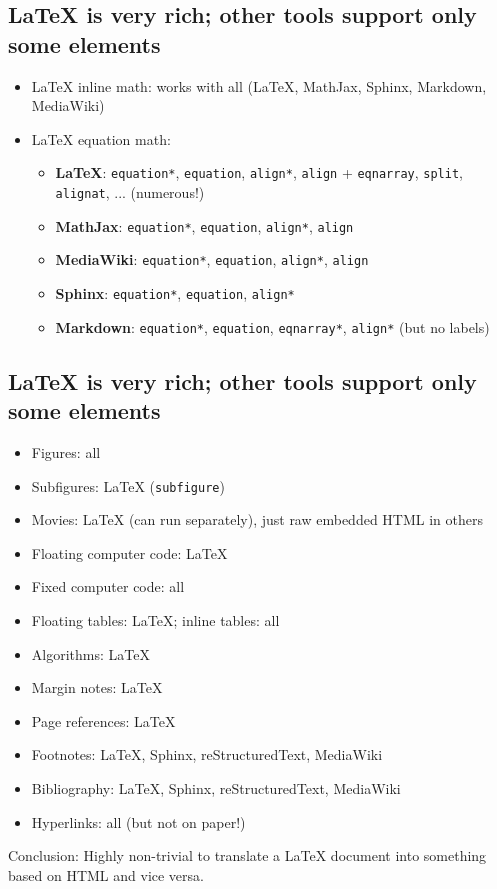 \documentclass[%
oneside,                 %
final,                   %
10pt]{article}
\begin{document}
\subsection{{\LaTeX} is very rich; other tools support only some elements}
\begin{itemize}
 \item {\LaTeX} inline math: works with all ({\LaTeX}, MathJax, Sphinx, Markdown, MediaWiki)
 \item {\LaTeX} equation math:
\begin{itemize}
    \item \textbf{LaTeX}: \texttt{equation*}, \texttt{equation}, \texttt{align*}, \texttt{align} + \texttt{eqnarray}, \texttt{split}, \texttt{alignat}, ... (numerous!)
    \item \textbf{MathJax}: \texttt{equation*}, \texttt{equation}, \texttt{align*}, \texttt{align}
    \item \textbf{MediaWiki}: \texttt{equation*}, \texttt{equation}, \texttt{align*}, \texttt{align}
    \item \textbf{Sphinx}: \texttt{equation*}, \texttt{equation}, \texttt{align*}
    \item \textbf{Markdown}: \texttt{equation*}, \texttt{equation}, \texttt{eqnarray*}, \texttt{align*} (but no labels)
\end{itemize}
\noindent
\end{itemize}
\noindent
\subsection{{\LaTeX} is very rich; other tools support only some elements}
\begin{itemize}
 \item Figures: all
 \item Subfigures: {\LaTeX} (\texttt{subfigure})
 \item Movies: {\LaTeX} (can run separately), just raw embedded HTML in others
 \item Floating computer code: {\LaTeX}
 \item Fixed computer code: all
 \item Floating tables: {\LaTeX}; inline tables: all
 \item Algorithms: {\LaTeX}
 \item Margin notes: {\LaTeX}
 \item Page references: {\LaTeX}
 \item Footnotes: {\LaTeX}, Sphinx, reStructuredText, MediaWiki
 \item Bibliography: {\LaTeX}, Sphinx, reStructuredText, MediaWiki
 \item Hyperlinks: all (but not on paper!)
\end{itemize}
\noindent
Conclusion: Highly non-trivial to translate a {\LaTeX} document into something
based on HTML and vice versa.
\end{document}

